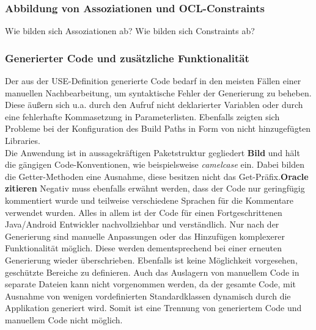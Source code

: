 \documentclass[a4paper,twoside]{article}
\begin{document}
\subsubsection{Abbildung von Assoziationen und OCL-Constraints}
Wie bilden sich Assoziationen ab?
Wie bilden sich Constraints ab?

\subsubsection{Generierter Code und zusätzliche Funktionalität}
Der aus der USE-Definition generierte Code bedarf in den meisten Fällen einer manuellen Nachbearbeitung, um syntaktische Fehler der Generierung zu beheben. Diese äußern sich u.a. durch den Aufruf nicht deklarierter Variablen oder durch eine fehlerhafte Kommasetzung in Parameterlisten. 
Ebenfalls zeigten sich Probleme bei der Konfiguration des Build Paths in Form von nicht hinzugefügten Libraries.\\
Die Anwendung ist in aussagekräftigen Paketstruktur gegliedert \textbf{Bild} und hält die gängigen Code-Konventionen, wie beispielsweise \textit{camelcase} ein. Dabei bilden die Getter-Methoden eine Ausnahme, diese besitzen nicht das Get-Präfix.\textbf{Oracle zitieren} Negativ muss ebenfalls erwähnt werden, dass der Code nur geringfügig kommentiert wurde und teilweise verschiedene Sprachen für die Kommentare verwendet wurden. Alles in allem ist der Code für einen Fortgeschrittenen Java/Android Entwickler nachvollziehbar und verständlich. Nur nach der Generierung sind manuelle Anpassungen oder das Hinzufügen komplexerer Funktionalität möglich. Diese werden dementsprechend bei einer erneuten Generierung wieder überschrieben. Ebenfalls ist keine Möglichkeit vorgesehen, geschützte Bereiche zu definieren. Auch das Auslagern von manuellem Code in separate Dateien kann nicht vorgenommen werden, da der gesamte Code, mit Ausnahme von wenigen vordefinierten Standardklassen dynamisch durch die Applikation generiert wird. Somit ist eine Trennung von generiertem Code und manuellem Code nicht möglich. 
\end{document}
